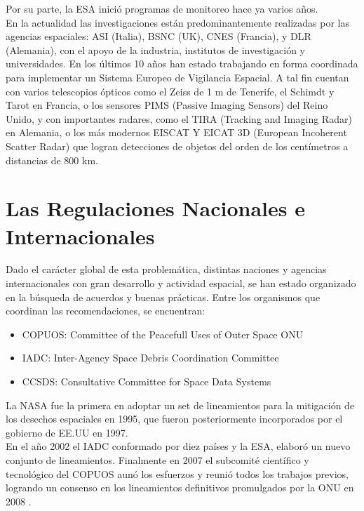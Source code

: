 Por su parte, la ESA inició programas de monitoreo hace ya varios años.\\
En la actualidad las investigaciones están predominantemente realizadas por las agencias espaciales: ASI (Italia), BSNC (UK), CNES (Francia), y DLR (Alemania), con el apoyo de la industria, institutos de investigación y universidades. En los últimos 10 años han estado trabajando en forma coordinada para implementar un Sistema Europeo de Vigilancia Espacial.
A tal fin cuentan con varios telescopios ópticos como el Zeiss de 1 m de Tenerife, el Schimdt y Tarot en Francia, o los sensores PIMS (Passive Imaging Sensors) del Reino Unido, y con importantes radares, como el TIRA (Tracking and Imaging Radar) en Alemania, o los más modernos EISCAT Y EICAT 3D (European Incoherent Scatter Radar) que logran detecciones de objetos del orden de los centímetros a distancias de 800 km.





\section{Las Regulaciones Nacionales e Internacionales}

Dado el car\'acter global de esta problem\'atica, distintas naciones y agencias internacionales con gran desarrollo y actividad espacial, se han estado organizado en la b\'usqueda de acuerdos y buenas pr\'acticas. Entre los organismos que coordinan las recomendaciones, se encuentran:\\

\begin{itemize}
\item COPUOS: Committee of the Peacefull Uses of Outer Space \ac{ONU}
\item IADC: Inter-Agency Space Debris Coordination Committee
\item CCSDS: Consultative Committee for Space Data Systems
\end{itemize}

La NASA fue la primera en adoptar un set de lineamientos para la mitigaci\'on de los desechos espaciales en 1995, que fueron posteriormente incorporados por el gobierno de EE.UU en 1997.\\
En el a\~no 2002 el IADC conformado por diez pa\'ises y la ESA, elabor\'o un nuevo conjunto de lineamientos.
Finalmente en 2007 el subcomit\'e cient\'ifico y tecnol\'ogico del COPUOS aun\'o los esfuerzos y reuni\'o todos los trabajos previos, logrando un consenso en los lineamientos definitivos promulgados por la ONU en 2008 \citep{nasaprogramme}.\\

